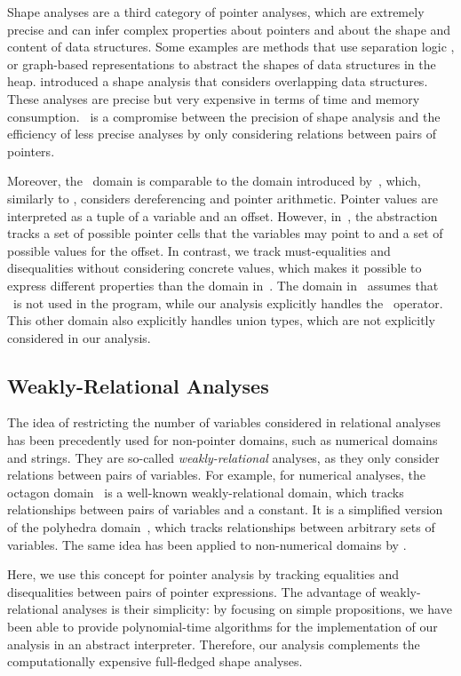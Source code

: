 Shape analyses are a third category of pointer analyses, which are extremely precise and can infer complex properties about pointers and about the shape and content of data structures.
Some examples are methods that use separation logic \cite{separationlogic,rivalpapers}, or graph-based representations \cite{predator} to abstract the shapes of data structures in the heap.
\textcite{kreiker} introduced a shape analysis that considers overlapping data structures.
These analyses are precise but very expensive in terms of time and memory consumption.
\cpo\ is a compromise between the precision of shape analysis and the efficiency of less precise analyses by only considering relations between pairs of pointers.

Moreover, the \cpo\ domain is comparable to the domain introduced by~\textcite{Mine06}, which, similarly to \cpo, considers dereferencing and pointer arithmetic.
Pointer values are interpreted as a tuple of a variable and an offset.
However, in~\cite{Mine06}, the abstraction tracks a set of possible pointer cells that the variables may point to and a set of possible values for the offset.
In contrast, we track must-equalities and disequalities without considering concrete values, which makes it possible to express different properties than the domain in~\cite{Mine06}.
The domain in~\cite{Mine06} assumes that \malloc\ is not used in the program, while our analysis explicitly handles the \malloc\ operator.
This other domain also explicitly handles union types, which are not explicitly considered in our analysis.

\subsection{Weakly-Relational Analyses}

The idea of restricting the number of variables considered in relational analyses has been precedently used for non-pointer domains, such as numerical domains and strings.
They are so-called \emph{weakly-relational} analyses, as they only consider relations between pairs of variables.
For example, for numerical analyses, the octagon domain~\cite{octagon} is a well-known weakly-relational domain, which tracks relationships between pairs of variables and a constant.
It is a simplified version of the polyhedra domain~\cite{polyhedra}, which tracks relationships between arbitrary sets of variables.
The same idea has been applied to non-numerical domains by \textcite{SeidlETS2023}.

Here, we use this concept for pointer analysis by tracking equalities and disequalities between pairs of pointer expressions.
The advantage of weakly-relational analyses is their simplicity: by focusing on simple propositions, we have been able to provide polynomial-time algorithms for the implementation of our analysis in an abstract interpreter.
Therefore, our analysis complements the computationally expensive full-fledged shape analyses.
